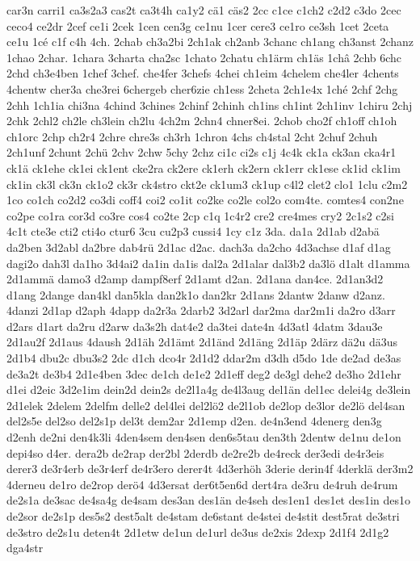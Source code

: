 {car3n
carri1
ca3s2a3
cas2t
ca3t4h
ca1y2
cä1
cäs2
2cc
c1ce
c1ch2
c2d2
c3do
2cec
ceco4
ce2dr
2cef
ce1i
2cek
1cen
cen3g
ce1nu
1cer
cere3
ce1ro
ce3sh
1cet
2ceta
ce1u
1cé
c1f
c4h
4ch.
2chab
ch3a2bi
2ch1ak
ch2anb
3chanc
ch1ang
ch3anst
2chanz
1chao
2char.
1chara
3charta
cha2sc
1chato
2chatu
ch1ärm
ch1äs
1châ
2chb
6chc
2chd
ch3e4ben
1chef
3chef.
che4fer
3chefs
4chei
ch1eim
4chelem
che4ler
4chents
4chentw
cher3a
che3rei
6chergeb
cher6zie
ch1ess
2cheta
2ch1e4x
1ché
2chf
2chg
2chh
1ch1ia
chi3na
4chind
3chines
2chinf
2chinh
ch1ins
ch1int
2ch1inv
1chiru
2chj
2chk
2chl2
ch2le
ch3lein
ch2lu
4ch2m
2chn4
chner8ei.
2chob
cho2f
ch1off
ch1oh
ch1orc
2chp
ch2r4
2chre
chre3s
ch3rh
1chron
4chs
ch4stal
2cht
2chuf
2chuh
2ch1unf
2chunt
2chü
2chv
2chw
5chy
2chz
ci1c
ci2s
c1j
4c4k
ck1a
ck3an
cka4r1
ck1ä
ck1ehe
ck1ei
ck1ent
cke2ra
ck2ere
ck1erh
ck2ern
ck1err
ck1ese
ck1id
ck1im
ck1in
ck3l
ck3n
ck1o2
ck3r
ck4stro
ckt2e
ck1um3
ck1up
c4l2
clet2
clo1
1clu
c2m2
1co
co1ch
co2d2
co3di
coff4
coi2
co1it
co2ke
co2le
col2o
com4te.
comtes4
con2ne
co2pe
co1ra
cor3d
co3re
cos4
co2te
2cp
c1q
1c4r2
cre2
cre4mes
cry2
2c1s2
c2si
4c1t
cte3e
cti2
cti4o
ctur6
3cu
cu2p3
cussi4
1cy
c1z
3da.
da1a
2d1ab
d2abä
da2ben
3d2abl
da2bre
dab4rü
2d1ac
d2ac.
dach3a
da2cho
4d3achse
d1af
d1ag
dagi2o
dah3l
da1ho
3d4ai2
da1in
da1is
dal2a
2d1alar
dal3b2
da3lö
d1alt
d1amma
2d1ammä
damo3
d2amp
dampf8erf
2d1amt
d2an.
2d1ana
dan4ce.
2d1an3d2
d1ang
2dange
dan4kl
dan5kla
dan2k1o
dan2kr
2d1ans
2dantw
2danw
d2anz.
4danzi
2d1ap
d2aph
4dapp
da2r3a
2darb2
3d2arl
dar2ma
dar2m1i
da2ro
d3arr
d2ars
d1art
da2ru
d2arw
da3s2h
dat4e2
da3tei
date4n
4d3atl
4datm
3dau3e
2d1au2f
2d1aus
4daush
2d1äh
2d1ämt
2d1änd
2d1äng
2d1äp
2därz
dä2u
dä3us
2d1b4
dbu2c
dbu3s2
2dc
d1ch
dco4r
2d1d2
ddar2m
d3dh
d5do
1de
de2ad
de3as
de3a2t
de3b4
2d1e4ben
3dec
de1ch
de1e2
2d1eff
deg2
de3gl
dehe2
de3ho
2d1ehr
d1ei
d2eic
3d2e1im
dein2d
dein2s
de2l1a4g
de4l3aug
del1än
del1ec
delei4g
de3lein
2d1elek
2delem
2delfm
delle2
del4lei
del2lö2
de2l1ob
de2lop
de3lor
de2lö
del4san
del2s5e
del2so
del2s1p
del3t
dem2ar
2d1emp
d2en.
de4n3end
4denerg
den3g
d2enh
de2ni
den4k3li
4den4sem
den4sen
den6s5tau
den3th
2dentw
de1nu
de1on
depi4so
d4er.
dera2b
de2rap
der2bl
2derdb
de2re2b
de4reck
der3edi
de4r3eis
derer3
de3r4erb
de3r4erf
de4r3ero
derer4t
4d3erhöh
3derie
derin4f
4derklä
der3m2
4derneu
de1ro
de2rop
derö4
4d3ersat
der6t5en6d
dert4ra
de3ru
de4ruh
de4rum
de2s1a
de3sac
de4sa4g
de4sam
des3an
des1än
de4seh
des1en1
des1et
des1in
des1o
de2sor
de2s1p
des5s2
dest5alt
de4stam
de6stant
de4stei
de4stit
dest5rat
de3stri
de3stro
de2s1u
deten4t
2d1etw
de1un
de1url
de3us
de2xis
2dexp
2d1f4
2d1g2
dga4str
}
